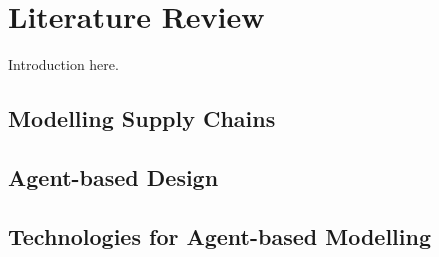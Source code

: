 \section{Literature Review}

Introduction here.

\subsection{Modelling Supply Chains}

\subsection{Agent-based Design}

\subsection{Technologies for Agent-based Modelling}
